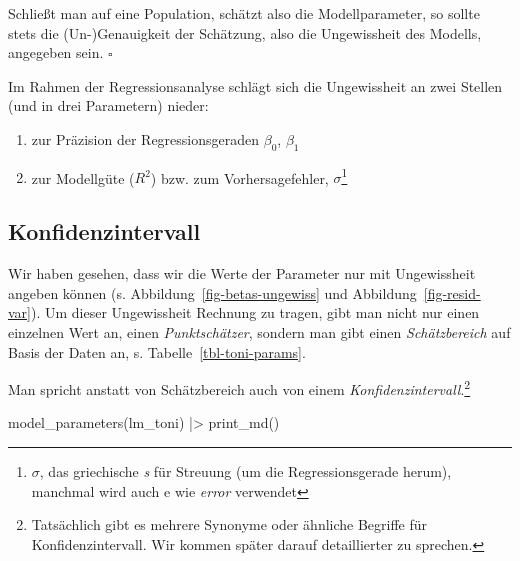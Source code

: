 \documentclass[
  ngerman,
  letterpaper,
  twoside,
  open=any]{scrbook}
\newenvironment{Shaded}{\begin{snugshade}}{\end{snugshade}}
\newcommand{\FunctionTok}[1]{\textcolor[rgb]{0.28,0.35,0.67}{#1}}
\newcommand{\NormalTok}[1]{\textcolor[rgb]{0.00,0.23,0.31}{#1}}
\newcommand{\SpecialCharTok}[1]{\textcolor[rgb]{0.37,0.37,0.37}{#1}}
\providecommand{\tightlist}{%
  \setlength{\itemsep}{0pt}\setlength{\parskip}{0pt}}\usepackage{longtable,booktabs,array}
\theoremstyle{definition}
\theoremstyle{plain}
\theoremstyle{definition}
\theoremstyle{definition}
\theoremstyle{remark}
\begin{document}
\begin{tcolorbox}[enhanced jigsaw, arc=.35mm, bottomrule=.15mm, bottomtitle=1mm, breakable, colback=white, colbacktitle=quarto-callout-important-color!10!white, colframe=quarto-callout-important-color-frame, coltitle=black, left=2mm, leftrule=.75mm, opacityback=0, opacitybacktitle=0.6, rightrule=.15mm, title=\textcolor{quarto-callout-important-color}{\faExclamation}\hspace{0.5em}{Wichtig}, titlerule=0mm, toprule=.15mm, toptitle=1mm]

Schließt man auf eine Population, schätzt also die Modellparameter, so
sollte stets die (Un-)Genauigkeit der Schätzung, also die Ungewissheit
des Modells, angegeben sein. \(\square\)

\end{tcolorbox}

Im Rahmen der Regressionsanalyse schlägt sich die Ungewissheit an zwei
Stellen (und in drei Parametern) nieder:

\begin{enumerate}
\def\labelenumi{\arabic{enumi}.}
\tightlist
\item
  zur Präzision der Regressionsgeraden \(\beta_0\), \(\beta_1\)
\item
  zur Modellgüte (\(R^2\)) bzw. zum Vorhersagefehler,
  \(\sigma\)\footnote{\(\sigma\), das griechische \emph{s} für Streuung
    (um die Regressionsgerade herum), manchmal wird auch e wie
    \emph{error} verwendet}
\end{enumerate}

\subsection{Konfidenzintervall}\label{konfidenzintervall}

Wir haben gesehen, dass wir die Werte der Parameter nur mit Ungewissheit
angeben können (s. Abbildung~\ref{fig-betas-ungewiss} und
Abbildung~\ref{fig-resid-var}). Um dieser Ungewissheit Rechnung zu
tragen, gibt man nicht nur einen einzelnen Wert an, einen
\emph{Punktschätzer}, sondern man gibt einen \emph{Schätzbereich} auf
Basis der Daten an, s. Tabelle~\ref{tbl-toni-params}.

Man spricht anstatt von Schätzbereich auch von einem
\emph{Konfidenzintervall}.\footnote{Tatsächlich gibt es mehrere Synonyme
  oder ähnliche Begriffe für Konfidenzintervall. Wir kommen später
  darauf detaillierter zu sprechen.}

\begin{Shaded}
\begin{Highlighting}[]
\FunctionTok{model\_parameters}\NormalTok{(lm\_toni) }\SpecialCharTok{|\textgreater{}} 
  \FunctionTok{print\_md}\NormalTok{()}
\end{Highlighting}
\end{Shaded}
\end{document}
